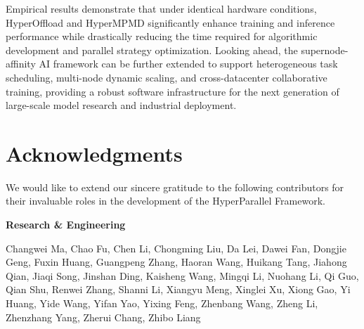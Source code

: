 \documentclass[11pt]{article}
\begin{document}
Empirical results demonstrate that under identical hardware conditions, HyperOffload and HyperMPMD significantly enhance training and inference performance while drastically reducing the time required for algorithmic development and parallel strategy optimization. Looking ahead, the supernode-affinity AI framework can be further extended to support heterogeneous task scheduling, multi-node dynamic scaling, and cross-datacenter collaborative training, providing a robust software infrastructure for the next generation of large-scale model research and industrial deployment.

\section{Acknowledgments}
We would like to extend our sincere gratitude to the following contributors for their invaluable roles in the development of the HyperParallel Framework.

\noindent \textbf{Research \& Engineering}


\noindent Changwei Ma,
Chao Fu,
Chen Li,
Chongming Liu,
Da Lei,
Dawei Fan,
Dongjie Geng,
Fuxin Huang,
Guangpeng Zhang,
Haoran Wang,
Huikang Tang,
Jiahong Qian,
Jiaqi Song,
Jinshan Ding,
Kaisheng Wang,
Mingqi Li,
Nuohang Li,
Qi Guo,
Qian Shu,
Renwei Zhang,
Shanni Li,
Xiangyu Meng,
Xinglei Xu,
Xiong Gao,
Yi Huang,
Yide Wang,
Yifan Yao,
Yixing Feng,
Zhenbang Wang,
Zheng Li,
Zhenzhang Yang,
Zherui Chang,
Zhibo Liang


\end{document}
